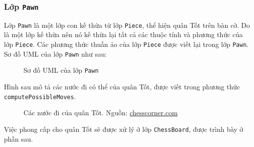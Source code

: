 \subsubsection{Lớp \lstinline{Pawn}}
Lớp \lstinline{Pawn} là một lớp con kế thừa từ lớp \lstinline{Piece}, thể hiện quân Tốt trên bàn cờ. Do là một lớp kế thừa nên nó kế thừa lại tất cả các thuộc tính và phương thức của lớp \lstinline{Piece}. Các phương thức thuần ảo của lớp \lstinline{Piece} được viết lại trong lớp \lstinline{Pawn}.\\
Sơ đồ UML của lớp \lstinline{Pawn} như sau:
\begin{figure}[H]
\caption{Sơ đồ UML của lớp \lstinline{Pawn}}
\end{figure}
Hình sau mô tả các nước đi có thể của quân Tốt, được viết trong phương thức \lstinline{computePossibleMoves}.
\begin{figure}[H]
\caption{Các nước đi của quân Tốt. Nguồn: \url{chesscorner.com}}
\end{figure}
Việc phong cấp cho quân Tốt sẽ được xử lý ở lớp \lstinline{ChessBoard}, được trình bày ở phần sau.

